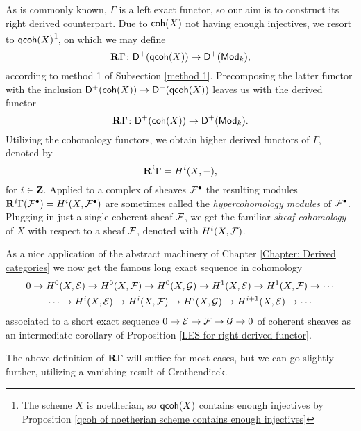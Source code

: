 As is commonly known, $\Gamma$ is a left exact functor, so our aim is to construct its right derived counterpart. Due to $\mathsf{coh}(X)$ not having enough injectives, we resort to $\mathsf{qcoh}(X)$\footnote{The scheme $X$ is noetherian, so $\mathsf{qcoh}(X)$ contains enough injectives by Proposition \ref{qcoh of noetherian scheme contains enough injectives}}, on which we may define 
\[
    \mathbf{R}^{}\Gamma\colon \mathsf{D}^+(\mathsf{qcoh}(X)) \to \mathsf{D}^+(\mathsf{Mod}_{k}),
\]
according to method 1 of Subsection \ref{method 1}. Precomposing the latter functor with the inclusion $\mathsf{D}^+(\mathsf{coh}(X)) \to \mathsf{D}^+(\mathsf{qcoh}(X))$ leaves us with the derived functor
\[
    \mathbf{R}^{}\Gamma \colon \mathsf{D}^+(\mathsf{coh}(X)) \to \mathsf{D}^+(\mathsf{Mod}_{k}).
\]
Utilizing the cohomology functors, we obtain higher derived functors of $\Gamma$, denoted by
\[
    \mathbf{R}^{i}\Gamma = H^{i}(X, -),
\]
for $i \in \mathbf Z$. Applied to a complex of sheaves $\mathcal F^\bullet$ the resulting modules $\mathbf{R}^{i}\Gamma(\mathcal F^\bullet) = H^i(X, \mathcal F^\bullet)$ are sometimes called the \emph{hypercohomology modules} of $\mathcal F^\bullet$.
Plugging in just a single coherent sheaf $\mathcal F$, we get the familiar \emph{sheaf cohomology} of $X$ with respect to a sheaf $\mathcal F$, denoted with $H^{i}(X, \mathcal F)$. 

\begin{remark}
    \label{LES in cohomology of SES of coherent sheaves}
    As a nice application of the abstract machinery of Chapter \ref{Chapter: Derived categories} we now get the famous long exact sequence in cohomology 
    \begin{multline}
        \label{eq: LES in cohomology of SES of coherent sheaves}
        0 \to H^{0}(X, \mathcal E) \to H^{0}(X, \mathcal F) \to H^{0}(X, \mathcal G) \to H^{1}(X, \mathcal E) \to H^{1}(X, \mathcal F) \to \cdots \\
        \cdots \to H^{i}(X, \mathcal E) \to H^{i}(X, \mathcal F) \to H^{i}(X, \mathcal G) \to H^{i+1}(X, \mathcal E) \to \cdots 
    \end{multline}
    associated to a short exact sequence $0 \to \mathcal E \to \mathcal F \to \mathcal G \to 0$ of coherent sheaves as an intermediate corollary of Proposition \ref{LES for right derived functor}.
\end{remark}

The above definition of $\mathbf{R}^{}\Gamma$ will suffice for most cases, but we can go slightly further, utilizing a vanishing result of Grothendieck.

